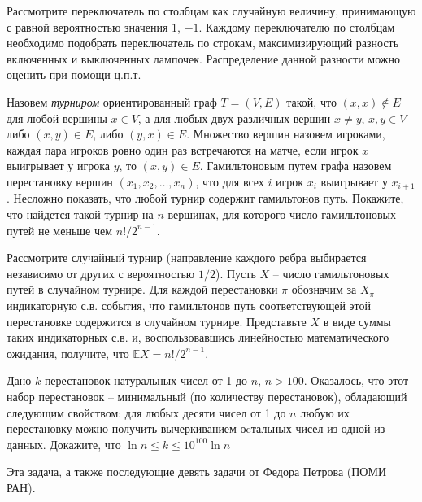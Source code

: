 \begin{ordre}
Рассмотрите  переключатель по столбцам как случайную величину, принимающую с равной вероятностью значения $1$, $-1$. Каждому переключателю по столбцам необходимо подобрать переключатель по строкам, максимизирующий разность включенных и 
выключенных лампочек. Распределение данной разности можно оценить при помощи ц.п.т.       
\end{ordre}


\begin{problem}
Назовем \textit{турниром} ориентированный граф $T=(V,E)$ такой, что $(x,x)\notin E$ для любой вершины $x\in V$, а для любых двух различных вершин $x\ne y$, $x,y\in V$ либо $(x,y)\in E$, либо $(y,x)\in E$. Множество вершин назовем игроками, каждая пара игроков ровно один раз встречаются на матче, если игрок $x$ выигрывает у игрока $y$, то $(x,y)\in E$. Гамильтоновым путем графа назовем перестановку вершин $(x_{1} ,x_{2} ,\ldots ,x_{n} )$, что для всех $i$ игрок $x_{i} $ выигрывает у $x_{i+1} $. Несложно показать, что любой турнир содержит гамильтонов путь. Покажите, что найдется такой турнир на $n$ вершинах, для которого число гамильтоновых путей не меньше чем $n!/2^{n-1}$.
\end{problem}

\begin{ordre}

Рассмотрите случайный турнир (направление каждого ребра выбирается независимо от других с вероятностью $1/2$). Пусть $X$ -- число гамильтоновых путей в случайном турнире. Для каждой перестановки $\pi $ обозначим за $X_{\pi } $ индикаторную с.в. события, что гамильтонов путь соответствующей этой перестановке содержится в случайном турнире. Представьте $X$ в виде суммы таких индикаторных с.в. и, воспользовавшись линейностью математического ожидания, получите, что $\mathbb E X=n!/2^{n-1}$.
\end{ordre}


\begin{problem}
Дано $k$ перестановок натуральных чисел от 1 до $n$, $n>100$. Оказалось, что этот набор перестановок -- минимальный (по количеству перестановок), обладающий следующим свойством: для любых десяти чисел от 1 до $n$ любую их перестановку можно получить вычеркиванием оcтальных чисел из одной из данных. Докажите, что $\ln n \leq k \leq 10^{100} \ln n$
\end{problem}

\begin{remark}
Эта задача, а также последующие девять задачи от Федора Петрова (ПОМИ РАН).
\end{remark}


